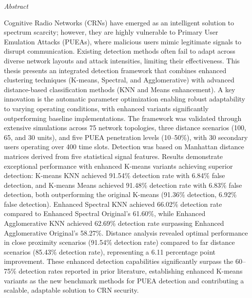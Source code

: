 \documentclass[10pt, oneside, article]{Thesis} %
\begin{document}
 {\huge{\textit{Abstract}} \par}{ 

Cognitive Radio Networks (CRNs) have emerged as an intelligent solution to spectrum scarcity; however, they are highly vulnerable to Primary User Emulation Attacks (PUEAs), where malicious users mimic legitimate signals to disrupt communication. Existing detection methods often fail to adapt across diverse network layouts and attack intensities, limiting their effectiveness. This thesis presents an integrated detection framework that combines enhanced clustering techniques (K-means, Spectral, and Agglomerative) with advanced distance-based classification methods (KNN and Means enhancement). A key innovation is the automatic parameter optimization enabling robust adaptability to varying operating conditions, with enhanced variants significantly outperforming baseline implementations. The framework was validated through extensive simulations across 75 network topologies, three distance scenarios (100, 65, and 30 units), and five PUEA penetration levels (10–50\%), with 30 secondary users operating over 400 time slots. Detection was based on Manhattan distance matrices derived from five statistical signal features. Results demonstrate exceptional performance with enhanced K-means variants achieving superior detection: K-means KNN achieved 91.54\% detection rate with 6.84\% false detection, and K-means Means achieved 91.48\% detection rate with 6.83\% false detection, both outperforming the original K-means (91.36\% detection, 6.92\% false detection). Enhanced Spectral KNN achieved 66.02\% detection rate compared to Enhanced Spectral Original's 61.60\%, while Enhanced Agglomerative KNN achieved 62.69\% detection rate surpassing Enhanced Agglomerative Original's 58.27\%. Distance analysis revealed optimal performance in close proximity scenarios (91.54\% detection rate) compared to far distance scenarios (85.43\% detection rate), representing a 6.11 percentage point improvement. These enhanced detection capabilities significantly surpass the 60–75\% detection rates reported in prior literature, establishing enhanced K-means variants as the new benchmark methods for PUEA detection and contributing a scalable, adaptable solution to CRN security.
}


\clearpage %

\end{document}
